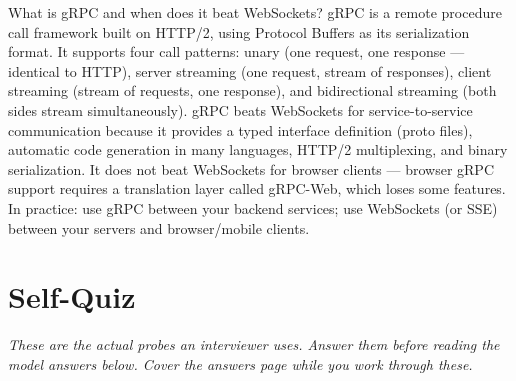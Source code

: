 \documentclass[11pt,a4paper]{article}
\begin{document}
\vspace{6pt}

\begin{curiobox}{What is gRPC and when does it beat WebSockets?}
gRPC is a remote procedure call framework built on HTTP/2, using Protocol Buffers as its serialization format. It supports four call patterns: unary (one request, one response --- identical to HTTP), server streaming (one request, stream of responses), client streaming (stream of requests, one response), and bidirectional streaming (both sides stream simultaneously). gRPC beats WebSockets for service-to-service communication because it provides a typed interface definition (proto files), automatic code generation in many languages, HTTP/2 multiplexing, and binary serialization. It does not beat WebSockets for browser clients --- browser gRPC support requires a translation layer called gRPC-Web, which loses some features. In practice: use gRPC between your backend services; use WebSockets (or SSE) between your servers and browser/mobile clients.
\end{curiobox}

\newpage
\section*{Self-Quiz}

\textit{These are the actual probes an interviewer uses. Answer them before reading the model answers below. Cover the answers page while you work through these.}

\vspace{8pt}
\end{document}

